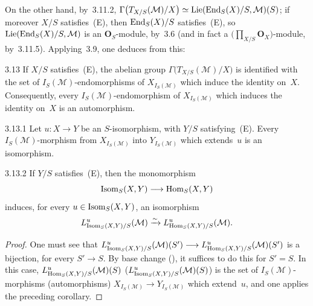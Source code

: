 {\renewcommand{\thefootnote}{(44)}}
On the other hand, by~3.11.2,%
\(\Gamma\bigl(T_{X/S}(\mathcal{M})/X\bigr)
  \simeq
  \operatorname{Lie}(\operatorname{End}_{S}(X)/S,\mathcal{M})(S)\);
if moreover \(X/S\) satisfies~(E), then \(\operatorname{End}_{S}(X)/S\) satisfies~(E), so
\(\operatorname{Lie}(\operatorname{End}_{S}(X)/S,\mathcal{M})\) is an \(\mathbf{O}_{S}\)-module, by~3.6
(and in fact a \(\bigl(\prod_{X/S}\mathbf{O}_{X}\bigr)\)-module, by~3.11.5).
Applying~3.9, one deduces from this:

\begin{proposition}{3.13}\label{II.3.13}
If \(X/S\) satisfies~(E), the abelian group
\(\Gamma\bigl(T_{X/S}(\mathcal{M})/X\bigr)\) is identified with the set of
\(I_{S}(\mathcal{M})\)-endomorphisms of \(X_{I_{S}(\mathcal{M})}\) which induce
the identity on~\(X\). Consequently, every \(I_{S}(\mathcal{M})\)-endomorphism
of \(X_{I_{S}(\mathcal{M})}\) which induces the identity on~\(X\) is an
automorphism.
\end{proposition}

\begin{corollary}{3.13.1}\label{II.3.13.1}
Let \(u\colon X\to Y\) be an \(S\)-isomorphism, with \(Y/S\) satisfying~(E).
Every \(I_{S}(\mathcal{M})\)-morphism from \(X_{I_{S}(\mathcal{M})}\) into
\(Y_{I_{S}(\mathcal{M})}\) which extends~\(u\) is an isomorphism.
\end{corollary}

\begin{corollary}{3.13.2}\label{II.3.13.2}
If \(Y/S\) satisfies~(E), then the monomorphism
\[
\operatorname{Isom}_{S}(X,Y)\longrightarrow\operatorname{Hom}_{S}(X,Y)
\]
induces, for every
\(u\in\operatorname{Isom}_{S}(X,Y)\), an isomorphism
\[
L^{u}_{\operatorname{Isom}_{S}(X,Y)/S}(\mathcal{M})
  \xrightarrow{\sim}
L^{u}_{\operatorname{Hom}_{S}(X,Y)/S}(\mathcal{M}).
\]
\end{corollary}

\begin{proof}
{\renewcommand{\thefootnote}{(45)}}
One must see that
\(L^{u}_{\operatorname{Isom}_{S}(X,Y)/S}(\mathcal{M})(S')
  \longrightarrow
  L^{u}_{\operatorname{Hom}_{S}(X,Y)/S}(\mathcal{M})(S')\)
is a bijection, for every \(S'\to S\). By base change (), it suffices
to do this for \(S'=S\). In this case,
\(L^{u}_{\operatorname{Hom}_{S}(X,Y)/S}(\mathcal{M})(S)\)
(\resp \(L^{u}_{\operatorname{Isom}_{S}(X,Y)/S}(\mathcal{M})(S)\))
is the set of \(I_{S}(\mathcal{M})\)-morphisms
(\resp automorphisms)
\(X_{I_{S}(\mathcal{M})}\to Y_{I_{S}(\mathcal{M})}\)
which extend~\(u\), and one applies the preceding corollary.
\end{proof}

